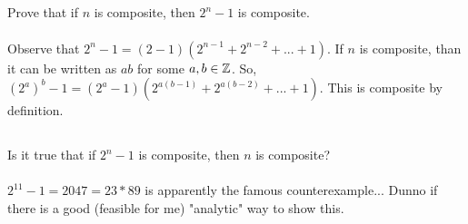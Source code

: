 \documentclass{article}
\begin{document}
\subsection{}
Prove that if $n$ is composite, then $2^n - 1$ is composite.\\~\\
Observe that $2^n - 1 = (2 - 1)(2^{n-1} + 2^{n-2} + ... + 1)$.
If $n$ is composite, than it can be written as $ab$ for some $a, b \in \mathbb{Z}$.
So, $(2^a)^b - 1 = (2^a - 1)(2^{a(b-1)} + 2^{a(b-2)} + ... + 1)$.
This is composite by definition.

\subsection{}
Is it true that if $2^n - 1$ is composite, then $n$ is composite?\\~\\
$2^{11} - 1 = 2047 = 23 * 89$ is apparently the famous counterexample...
Dunno if there is a good (feasible for me) "analytic" way to show this.
\end{document}
